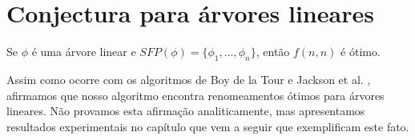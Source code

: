 \section{Conjectura para árvores lineares}

\indent

\begin{conjecture}
	Se $\phi$ é uma árvore linear e $SFP(\phi) = \{\phi_1,...,\phi_n \}$, então $f(n,n)$ é ótimo.
\end{conjecture}

Assim como ocorre com os algoritmos de Boy de la Tour \cite{de1992optimality} e Jackson et al. \cite{jackson2004clause}, afirmamos que nosso algoritmo encontra renomeamentos ótimos para árvores lineares. Não provamos esta afirmação analiticamente, mas apresentamos resultados experimentais no capítulo que vem a seguir que exemplificam este fato.
